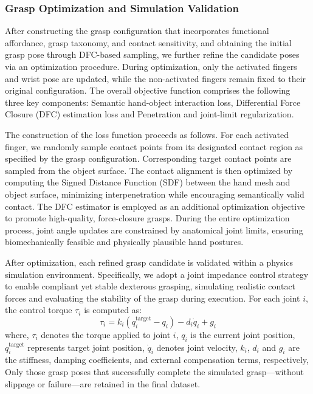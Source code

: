 \subsubsection{Grasp Optimization and Simulation Validation}

After constructing the grasp configuration that incorporates functional affordance, grasp taxonomy, and contact sensitivity, and obtaining the initial grasp pose through DFC-based sampling, we further refine the candidate poses via an optimization procedure. During optimization, only the activated fingers and wrist pose are updated, while the non-activated fingers remain fixed to their original configuration.
The overall objective function comprises the following three key components: Semantic hand-object interaction loss, Differential Force Closure (DFC) estimation loss and Penetration and joint-limit regularization. 

The construction of the loss function proceeds as follows. 
For each activated finger, we randomly sample contact points from its designated contact region as specified by the grasp configuration. 
Corresponding target contact points are sampled from the object surface. 
The contact alignment is then optimized by computing the Signed Distance Function (SDF) between the hand mesh and object surface, minimizing interpenetration while encouraging semantically valid contact. 
The DFC estimator is employed as an additional optimization objective to promote high-quality, force-closure grasps. 
During the entire optimization process, joint angle updates are constrained by anatomical joint limits, ensuring biomechanically feasible and physically plausible hand postures.

After optimization, each refined grasp candidate is validated within a physics simulation environment. Specifically, we adopt a joint impedance control strategy to enable compliant yet stable dexterous grasping, simulating realistic contact forces and evaluating the stability of the grasp during execution. 
For each joint $i$, the control torque $\tau_{i}$ is computed as:
  \begin{equation}
\tau_i=k_i\left(q_i^{\text {target}}-q_i\right)-d_i \dot{q}_i+g_i
\end{equation}
where, $\tau_{i}$ denotes the torque applied to joint $i$, $q_i$ is the current joint position, $q_i^{\text {target}}$ represents target joint position, $\dot{q}_i$ denotes joint velocity, $k_i$, $d_i$ and $g_i$ are the stiffness, damping coefficients, and external compensation terms, respectively,
Only those grasp poses that successfully complete the simulated grasp—without slippage or failure—are retained in the final dataset. 


